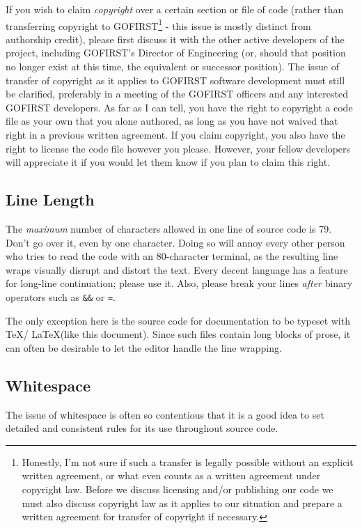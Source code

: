\documentclass[12pt]{article}
\newcommand{\code}[1]{\texttt{#1}}
\begin{document}
If you wish to claim \emph{copyright} over a certain section or file of code (rather than transferring copyright to GOFIRST\footnote{Honestly, I'm not sure if such a transfer is legally possible without an explicit written agreement, or what even counts as a written agreement under copyright law. Before we discuss licensing and/or publishing our code we must also discuss copyright law as it applies to our situation and prepare a written agreement for transfer of copyright if necessary.}
- this issue is mostly distinct from authorship credit), please first discuss it with the other active developers of the project, including GOFIRST's Director of Engineering (or, should that position no longer exist at this time, the equivalent or successor position). The issue of transfer of copyright as it applies to GOFIRST software development must still be clarified, preferably in a meeting of the GOFIRST officers and any interested GOFIRST developers. As far as I can tell, you have the right to copyright a code file as your own that you alone authored, as long as you have not waived that right in a previous written agreement. If you claim copyright, you also have the right to license the code file however you please. However, your fellow developers will appreciate it if you would let them know if you plan to claim this right.

\subsection{Line Length}
\label{sec:maxlinelength}
The \emph{maximum} number of characters allowed in one line of source code is 79. Don't go over it, even by one character. Doing so will annoy every other person who tries to read the code with an 80-character terminal, as the resulting line wraps visually disrupt and distort the text. Every decent language has a feature for long-line continuation; please use it. Also, please break your lines \textit{after} binary operators such as \code{\&\&} or \code{=}.

The only exception here is the source code for documentation to be typeset with \TeX / \LaTeX (like this document). Since such files contain long blocks of prose, it can often be desirable to let the editor handle the line wrapping.

\subsection{Whitespace}
\label{sec:spacing}
The issue of whitespace is often so contentious that it is a good idea to set detailed and consistent rules for its use throughout source code.
\end{document}
